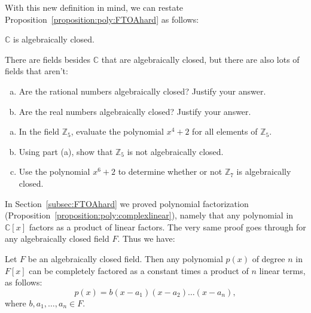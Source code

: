 With this new definition in mind, we can restate Proposition~\ref{proposition:poly:FTOAhard} as follows: 

\begin{prop}\label{proposition:rings:complexalgclosed}
$\mathbb{C}$ is algebraically closed.
\end{prop}

There are fields  besides $\mathbb{C}$ that are algebraically closed,  but there are  also  lots of fields that aren't:

\begin{exercise}
\begin{enumerate}[(a)]
\item
Are the rational numbers algebraically closed? Justify your answer.
\item
Are the real numbers algebraically closed? Justify your answer.
\end{enumerate}
\end{exercise}

\begin{exercise}
\begin{enumerate}[(a)]
\item
In the field $\mathbb{Z}_5$, evaluate the polynomial $x^4+2$  for all elements of  $\mathbb{Z}_5$.
\item
Using part (a), show  that $\mathbb{Z}_5$ is not algebraically closed.
\item
Use the polynomial $x^6 + 2$ to determine whether or not $\mathbb{Z}_7$ is algebraically closed.
\end{enumerate}
\end{exercise}

In Section~\ref{subsec:FTOAhard} we proved polynomial factorization (Proposition~\ref{proposition:poly:complexlinear}), namely that any polynomial in $\mathbb{C}[x]$ factors as a product of linear factors. The very same proof goes through for any algebraically closed field $F$.  Thus we have:

\begin{prop}\label{proposition:rings:algClosedLinear}
Let $F$ be an algebraically closed field. Then any polynomial $p(x)$  of degree $n$ in $F[x]$ can be completely factored as a constant times a product of $n$ linear terms,   as follows:
\begin{equation}
p(x) = b(x -a_1)(x-a_2) \ldots (x - a_n),
\end{equation}
where $b,a_1,\ldots,a_n \in F$.
\end{prop}



